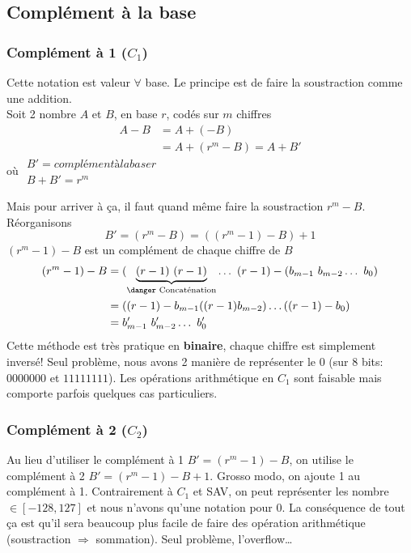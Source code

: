 \subsection{Complément à la base}
\subsubsection{Complément à 1 ($C_1$)}
Cette notation est valeur $\forall$ base. Le principe est de faire la soustraction comme une addition.\\
Soit 2 nombre $A$ et $B$, en base $r$, codés sur $m$ chiffres
\begin{align}
	A-B &= A + (-B)\\
	&= A + (r^m-B) = A+B'
\end{align}
\hfill où
$\begin{array}{l}
		B' = complément à la base r\\
		B+B'=r^m
\end{array}$

Mais pour arriver à ça, il faut quand même faire la soustraction $r^m-B$. Réorganisons
\begin{equation}
	B'=(r^m-B)=((r^m-1)-B)+1
\end{equation}
$(r^m-1)-B$ est un complément de chaque chiffre de $B$
\begin{align}
	(r^m-1)-B &=(\underbrace{(r-1)\ (r-1)}_{\text{\danger Concaténation}}\dots\ (r-1)-(b_{m-1}\ b_{m-2}\dots\ b_0)\\
	&= ((r-1)-b_{m-1}((r-1)b_{m-2})\dots((r-1)-b_0)\\
	&= b'_{m-1}\ b'_{m-2}\dots\ b'_0
\end{align}
Cette méthode est très pratique en \textbf{binaire}, chaque chiffre est simplement inversé! Seul problème, nous avons 2 manière de représenter le 0 (sur 8 bits: $0000000$ et $11111111$). Les opérations arithmétique en $C_1$ sont faisable mais comporte parfois quelques cas particuliers.
\subsubsection{Complément à 2 ($C_2$)}
Au lieu d'utiliser le complément à 1 $B'=(r^m-1)-B$, on utilise le complément à 2 $B'=(r^m-1)-B+1$. Grosso modo, on ajoute 1 au complément à 1. Contrairement à $C_1$ et SAV, on peut représenter les nombre $\in [-128,127]$ et nous n'avons qu'une notation pour 0. La conséquence de tout ça est qu'il sera beaucoup plus facile de faire des opération arithmétique (soustraction $\Rightarrow$ sommation). Seul problème, l'overflow\dots
